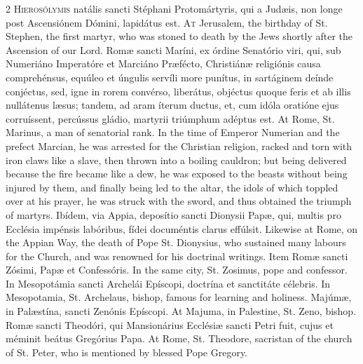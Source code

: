 \begin{paracol}{2}
\lettrine[lines=2]{H}{ierosólymis} natális sancti Stéphani Protomártyris, qui a Judæis, 
 non longe post Ascensiónem Dómini, lapidátus est.
\switchcolumn
{}
\lettrine[lines=2]{A}{t} Jerusalem, the birthday of St. Stephen, the first martyr, who was stoned 
 to death by the Jews shortly after the Ascension of our Lord.
\switchcolumn*
{}
Romæ sancti Maríni, ex órdine Senatório viri, 
 qui, sub Numeriáno Imperatóre et Marciáno Præfécto, Christiánæ religiónis 
 causa comprehénsus, equúleo et úngulis servíli more punítus, in sartáginem 
 deínde conjéctus, sed, igne in rorem convérso, liberátus, objéctus quoque 
 feris et ab illis nullátenus læsus; tandem, ad aram íterum ductus, et, cum 
 idóla oratióne ejus corruíssent, percússus gládio, martyrii triúmphum 
 adéptus est.
\switchcolumn
{}
At Rome, St. Marinus, a man of senatorial rank. In the time of Emperor 
 Numerian and the prefect Marcian, he was arrested for the Christian 
 religion, racked and torn with iron claws like a slave, then thrown into a 
 boiling cauldron; but being delivered because the fire became like a dew, he 
 was exposed to the beasts without being injured by them, and finally being 
 led to the altar, the idols of which toppled over at his prayer, he was 
 struck with the sword, and thus obtained the triumph of martyrs.
\switchcolumn*
{}
Ibídem, via Appia, deposítio sancti Dionysii Papæ, 
 qui, multis pro Ecclésia impénsis labóribus, fídei documéntis clarus 
 effúlsit.
\switchcolumn
{}
Likewise at Rome, on the Appian Way, the death of Pope St. Dionysius, who 
 sustained many labours for the Church, and was renowned for his doctrinal 
 writings.
\switchcolumn*
{}
Item Romæ sancti Zósimi, Papæ et Confessóris.
\switchcolumn
{}
In the same city, St. Zosimus, pope and confessor.
\switchcolumn*
{}
In Mesopotámia sancti Archelái Epíscopi, doctrína et sanctitáte célebris.
\switchcolumn
{}
In Mesopotamia, St. Archelaus, bishop, famous for learning and holiness.
\switchcolumn*
{}
Majúmæ, in Palæstína, sancti Zenónis Epíscopi.
\switchcolumn
{}
At Majuma, in Palestine, St. Zeno, bishop.
\switchcolumn*
{}
Romæ sancti Theodóri, qui Mansionárius Ecclésiæ 
 sancti Petri fuit, cujus et méminit beátus Gregórius Papa.
\switchcolumn
{}
At Rome, St. Theodore, sacristan of the church of St. Peter, who is 
 mentioned by blessed Pope Gregory.
\switchcolumn*
{}
\end{paracol}


